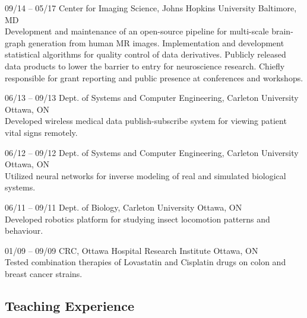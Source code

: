 \documentclass[]{friggeri-cv} %
\begin{document}
\begin{entrylist}
\entry
{09/14 -- 05/17}
{Center for Imaging Science, Johns Hopkins University}
{Baltimore, MD}
{\\
Development and maintenance of an open-source pipeline for multi-scale brain-graph generation
from human MR images. Implementation and development statistical algorithms for quality control
of data derivatives. Publicly released data products to lower the barrier to entry for neuroscience
research. Chiefly responsible for grant reporting and public presence at conferences and workshops.}

\end{entrylist}
\begin{entrylist}
\entry
{06/13 -- 09/13}
{Dept. of Systems and Computer Engineering, Carleton University}
{Ottawa, ON}
{\\
Developed wireless medical data publish-subscribe system for viewing patient vital signs remotely.}

\entry
{06/12 -- 09/12}
{Dept. of Systems and Computer Engineering, Carleton University}
{Ottawa, ON}
{\\
Utilized neural networks for inverse modeling of real and simulated biological systems.}

\entry
{06/11 -- 09/11}
{Dept. of Biology, Carleton University}
{Ottawa, ON}
{\\
Developed robotics platform for studying insect locomotion patterns and behaviour.}

\entry
{01/09 -- 09/09}
{CRC, Ottawa Hospital Research Institute}
{Ottawa, ON}
{\\
Tested combination therapies of Lovastatin and Cisplatin drugs on colon and breast cancer strains.}
\end{entrylist}

\subsection{Teaching Experience}
\end{document}
